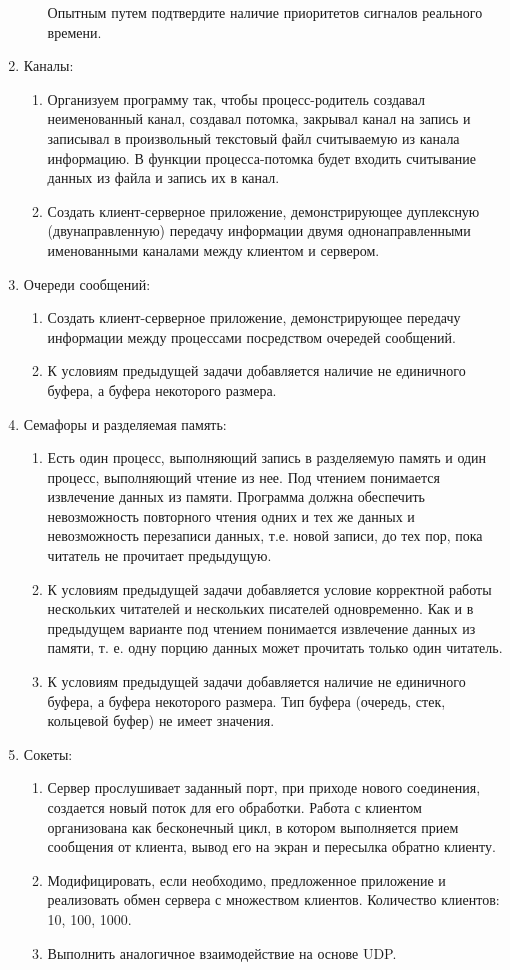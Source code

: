 \begin{enumerate}
\begin{enumerate}
			Опытным путем подтвердите наличие приоритетов сигналов реального времени.
		\end{enumerate}
	\item Каналы:
		\begin{enumerate}
			\item Организуем программу  так, чтобы процесс-родитель создавал неименованный канал, создавал потомка, закрывал канал на запись и записывал в произвольный текстовый файл считываемую из канала информацию. В функции процесса-потомка будет входить считывание данных из файла и запись их в канал.
			\item Создать клиент-серверное приложение, демонстрирующее дуплексную (двунаправленную) передачу информации двумя однонаправленными именованными каналами между клиентом и сервером.
		\end{enumerate}
	\item Очереди сообщений:
		\begin{enumerate}
			\item Создать клиент-серверное приложение, демонстрирующее передачу информации между процессами посредством очередей сообщений.
			\item К условиям предыдущей задачи добавляется наличие не единичного буфера, а буфера некоторого размера.
		\end{enumerate}
	\item Семафоры и разделяемая память:
		\begin{enumerate}
			\item Есть один процесс, выполняющий запись в разделяемую память и один процесс, выполняющий чтение из нее. Под чтением понимается извлечение данных из памяти. Программа должна обеспечить невозможность повторного чтения одних и тех же данных и невозможность перезаписи данных, т.е. новой записи, до тех пор, пока читатель не прочитает предыдущую.
			\item К условиям предыдущей задачи добавляется условие корректной работы нескольких читателей и нескольких писателей одновременно. Как и в предыдущем варианте под чтением понимается извлечение данных из памяти, т. е. одну порцию данных может прочитать только один читатель.
			\item К условиям предыдущей задачи добавляется наличие не единичного буфера, а буфера некоторого размера. Тип буфера (очередь, стек, кольцевой буфер) не имеет значения.
		\end{enumerate}
	\item Сокеты:
		\begin{enumerate}
			\item Сервер прослушивает заданный порт, при приходе нового соединения, создается новый поток для его обработки. Работа с клиентом организована как бесконечный цикл, в котором выполняется прием сообщения от клиента, вывод его на экран и пересылка обратно клиенту.
			\item Модифицировать, если необходимо, предложенное приложение и реализовать обмен сервера с множеством клиентов. Количество клиентов: 10, 100, 1000.
			\item Выполнить аналогичное взаимодействие на основе UDP.
		\end{enumerate}
\end{enumerate}
